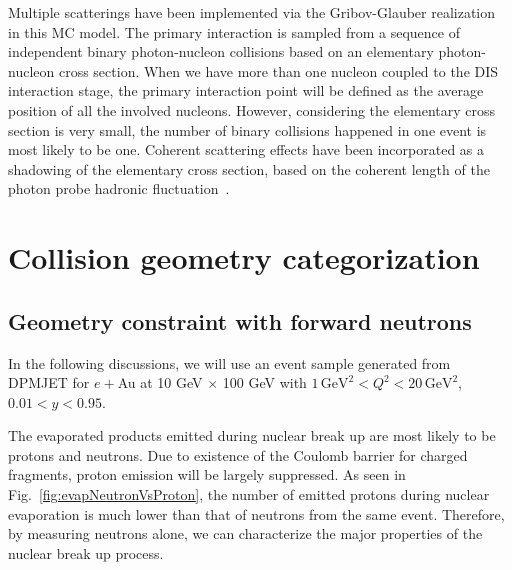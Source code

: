 Multiple scatterings have been implemented via the Gribov-Glauber
realization~\cite{Shmakov:1988sc} in this MC model. The primary interaction is
sampled from a sequence of independent binary photon-nucleon collisions based on
an elementary photon-nucleon cross section. When we have more than one nucleon
coupled to the DIS interaction stage, the primary interaction point will be
defined as the average position of all the involved nucleons. However,
considering the elementary cross section is very small, the number of binary
collisions happened in one event is most likely to be one. Coherent scattering
effects have been incorporated as a shadowing of the elementary cross section,
based on the coherent length of the photon probe hadronic
fluctuation~\cite{Piller:1999wx}.


\section{Collision geometry categorization} \label{sec:geoCategory}

\subsection{Geometry constraint with forward neutrons}
In the following discussions, we will use an event sample
generated from DPMJET for $e+$Au at 10 GeV $\times$ 100 GeV with $1 \, \mathrm{GeV}^{2}
< Q^{2} < 20 \, \mathrm{GeV}^{2}$, $ 0.01<y<0.95$.

The evaporated products emitted during nuclear break up are most likely to be protons
and neutrons. Due to existence of the Coulomb barrier for charged fragments,
proton emission will be largely suppressed. As seen in
Fig.~\ref{fig:evapNeutronVsProton}, the number of emitted protons during nuclear
evaporation is much lower than that of neutrons from the same event.
Therefore, by measuring neutrons alone, we can characterize the major
properties of the nuclear break up process.

